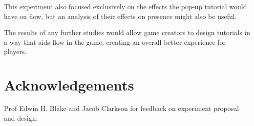 \documentclass{acmsiggraph}
\begin{document}
This experiment also focused exclusively on the effects the pop-up tutorial would have on flow, but an analysis of their effects on presence might also be useful.

The results of any further studies would allow game creators to design tutorials in a way that aids flow in the game, creating an overall better experience for players.

\section*{Acknowledgements}

Prof Edwin H. Blake and Jacob Clarkson for feedback on experiment proposal and design.


\nocite{*}

\end{document}
